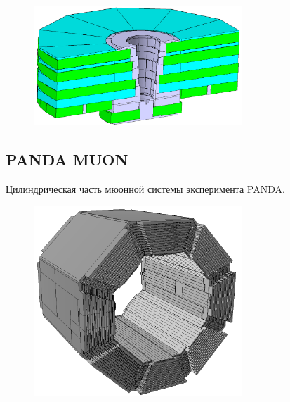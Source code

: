 \begin{figure}[H]
\centering
\includegraphics[width=0.7\textwidth]{pictures/CMS_MUON.png}
\caption{}
\label{fig:CmsMuon}
\end{figure}

\subsection{PANDA MUON}

Цилиндрическая часть мюонной системы эксперимента PANDA.

\begin{figure}[H]
\centering
\includegraphics[width=0.7\textwidth]{pictures/PANDA_MUON_barrel.png}
\caption{}
\label{fig:PandaMuonBarrel}
\end{figure}

